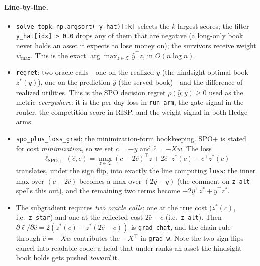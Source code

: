 \documentclass[11pt,a4paper]{article}
\theoremstyle{definition}
\theoremstyle{plain}
\begin{document}
\paragraph{Line-by-line.}
\begin{itemize}
  \item \texttt{solve\_topk}: \texttt{np.argsort(-y\_hat)[:k]} selects the
        $k$ largest scores; the filter \texttt{y\_hat[idx] > 0.0} drops any
        of them that are negative (a long-only book never holds an asset it
        expects to lose money on); the survivors receive weight
        $w_{\max}$. This is the exact $\arg\max_{z \in \mathcal{Z}}
        \hat{y}^\top z$, in $O(n \log n)$.
  \item \texttt{regret}: two oracle calls---one on the realized $y$ (the
        hindsight-optimal book $z^*(y)$), one on the prediction $\hat y$ (the
        served book)---and the difference of realized utilities. This is the
        SPO decision regret $\rho(\hat y; y) \ge 0$ used as the metric
        \emph{everywhere}: it is the per-day loss in \texttt{run\_arm}, the
        gate signal in the router, the competition score in RISP, and
        the weight signal in both Hedge arms.
  \item \texttt{spo\_plus\_loss\_grad}: the minimization-form bookkeeping.
        SPO+ is stated for cost \emph{minimization}, so we set $c = -y$ and
        $\hat c = -Xw$. The loss
        \[
          \ell_{\mathrm{SPO+}}(\hat c, c)
          = \max_{z \in \mathcal{Z}} (c - 2\hat c)^\top z
            + 2 \hat c^\top z^*(c) - c^\top z^*(c)
        \]
        translates, under the sign flip, into exactly the line computing
        \texttt{loss}: the inner max over $(c - 2\hat c)$ becomes a max over
        $(2\hat y - y)$ (the comment on \texttt{z\_alt} spells this out), and
        the remaining two terms become $-2\hat y^\top z^* + y^\top z^*$.
  \item The subgradient requires \emph{two oracle calls}: one at the true
        cost ($z^*(c)$, i.e.\ \texttt{z\_star}) and one at the reflected
        cost $2\hat c - c$ (i.e.\ \texttt{z\_alt}). Then
        $\partial \ell / \partial \hat c = 2(z^*(c) - z^*(2\hat c - c))$
        is \texttt{grad\_chat}, and the chain rule through
        $\hat c = -Xw$ contributes the $-X^\top$ in \texttt{grad\_w}. Note
        the two sign flips cancel into readable code: a head that
        under-ranks an asset the hindsight book holds gets pushed
        \emph{toward} it.
\end{itemize}
\end{document}
